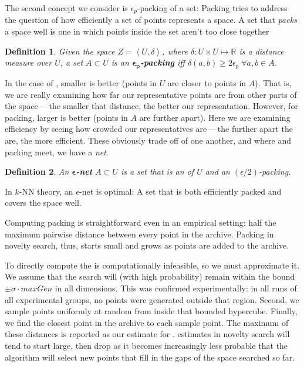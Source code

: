 \documentclass[twoside]{article}
\newtheorem{definition}{Definition}
\newcommand{\IR}{\mathbb{R}}
\begin{document}
The second concept we consider is $\epsilon_p$-packing of a set:  Packing tries to address the question of how efficiently a set of points represents a space.  A set that \emph{packs} a space well is one in which points inside the set aren't too close together

\begin{definition}
Given the space $Z=\left\langle U, \delta\right\rangle$, where $\delta: U\times U \mapsto \IR$ is a distance measure over $U$, a set $A\subset U$ is an $\boldsymbol{\epsilon_p}$\textbf{-packing} iff $\delta(a,b) \geq 2\epsilon_p \; \forall a,b \in A$. 
\end{definition}

In the case of , smaller is better (points in $U$ are closer to points in $A$).  That is, we are really examining how far our representative points are from other parts of the space\,---\,the smaller that distance, the better our representation.  However, for packing, larger is better (points in $A$ are further apart).  Here we are examining efficiency by seeing how crowded our representatives are\,---\,the further apart the are, the more efficient.  These obviously trade off of one another, and where  and packing meet, we have a \emph{net}.  

\begin{definition}
An $\boldsymbol{\epsilon}$\textbf{-net} $A \subset U$ is a set that is an  of $U$ and an $(\epsilon/2)$-packing.
\end{definition}
%
In $k$-NN theory, an $\epsilon$-net is optimal:  A set that is both efficiently packed and covers the space well.

Computing packing is straightforward even in an empirical setting:  half the maximum pairwise distance between every point in the archive.  Packing in novelty search, thus, starts small and grows as points are added to the archive. 

To directly compute the  is computationally infeasible, so we must approximate it.  We assume that the search will (with high probability) remain within the bound $\pm\sigma\cdot maxGen$ in all dimensions.  This was confirmed experimentally:  in all runs of all experimental groups, no points were generated outside that region.  Second, we sample points uniformly at random from inside that bounded hypercube.  Finally, we find the closest point in the archive to each sample point. The maximum of these distances is reported as our estimate for .   estimates in novelty search will tend to start large, then drop as it becomes increasingly less probable that the algorithm will select new points that fill in the gaps of the space searched so far.
\end{document}
